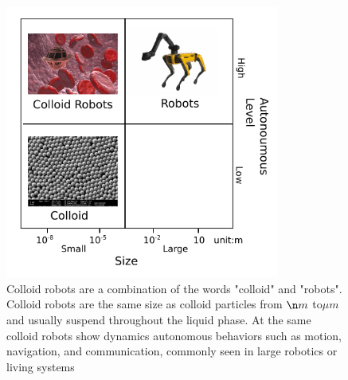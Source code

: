 \begin{figure}
\centering
\includegraphics[width=9cm]{figures/1_1.pdf}
\caption{Colloid robots are a combination of the words "colloid" and "robots". Colloid robots are the same size as colloid particles from $\n m$ to$\mu m$ and usually suspend throughout the liquid phase. At the same colloid robots show dynamics autonomous behaviors such as motion, navigation, and communication, commonly seen in large robotics or living systems}
\label{fig:1.1}
\end{figure}


